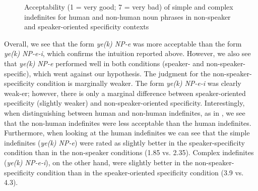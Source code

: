 \documentclass[output=paper]{langsci/langscibook}
\begin{document}
\begin{figure}


\dataset
{}
\caption{Acceptability (1 = very good; 7 = very bad) of simple and complex indefinites for human and non-human noun phrases in non-speaker and speaker-oriented specificity contexts}\label{4fig:2}
\end{figure}


{
\largerpage
Overall, we see that the form {\emph{ye(k) NP-e}} was more acceptable than the form {\emph{ye(k) NP-e-i}}, which confirms the intuition reported above. However, we also see that {\emph{ye(k)}} \mbox{\emph{NP-e}} performed well in both conditions (speaker- and non-speaker-specific), which went against our hypothesis. The judgment for the non-speaker-specificity condition is marginally weaker. The form {\emph{ye(k) NP-e-i}} was clearly weak-er; however, there is only a marginal difference between speaker-oriented specificity (slightly weaker) and non-speaker-oriented specificity. Interestingly, when distinguishing
between human and non-human indefinites, as in , we see that the non-human indefinites were less acceptable than the human indefinites. Furthermore, when looking at the human indefinites we can see that the simple indefinites ({\emph{ye(k) NP-e}}) were rated as slightly better in the speaker-specificity condition than in the non-speaker conditions (1.85 vs. 2.35).
\largerpage[2]
Complex indefinites ({\emph{ye(k) NP-e-i}}), on the other hand, were slightly better in the non-speaker-specificity condition than in the speaker-oriented specificity condition (3.9 vs. 4.3).
}\clearpage
\end{document}
